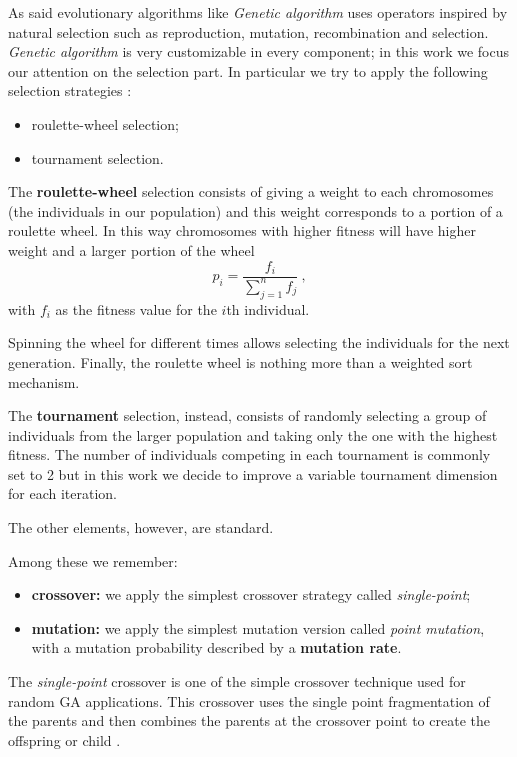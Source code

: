 \documentclass[10pt]{article}
\begin{document}
As said evolutionary algorithms like \textit{Genetic algorithm} uses operators inspired by natural selection such as reproduction, mutation, recombination and selection.
\textit{Genetic algorithm} is very customizable in every component; in this work we focus our attention on the selection part.
In particular we try to apply the following selection strategies \cite{ventuno}:
\begin{itemize}
\item roulette-wheel selection;
\item tournament selection.
\end{itemize}
The \textbf{roulette-wheel} selection consists of giving a weight to each chromosomes (the individuals in our population) and this weight corresponds to a portion of a roulette wheel.
In this way chromosomes with higher fitness will have higher weight and a larger portion of the wheel
\begin{equation}
p_i = \frac{f_i}{\sum_{j = 1}^n f_j} ~,
\end{equation}
with $f_i$ as the fitness value for the $i$th individual.

Spinning the wheel for different times allows selecting the individuals for the next generation.
Finally, the roulette wheel is nothing more than a weighted sort mechanism.

The \textbf{tournament} selection, instead, consists of randomly selecting a group of individuals from the larger population and taking only the one with the highest fitness. 
The number of individuals competing in each tournament is commonly set to 2 but in this work we decide to improve a variable tournament dimension for each iteration.

The other elements, however, are standard.

Among these we remember:
\begin{itemize}
\item \textbf{crossover:} we apply the simplest crossover strategy called \textit{single-point};
\item \textbf{mutation:} we apply the simplest mutation version called \textit{point mutation}, with a mutation probability described by a \textbf{mutation rate}.
\end{itemize}
The \textit{single-point} crossover is one of the simple crossover technique used for random GA applications. This crossover uses the single point fragmentation of the parents and then combines the parents at the crossover point to create the offspring or child \cite{venticinque}.
\end{document}
